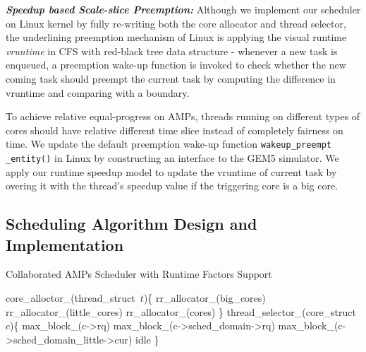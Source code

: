\documentclass[sigplan,review,anonymous]{acmart}\settopmatter{printfolios=true,printccs=false,printacmref=false}
\begin{document}
\textbf{\textit {Speedup based Scale-slice Preemption:}} Although we implement our scheduler on Linux kernel by fully re-writing both the core allocator and thread selector, the underlining preemption mechanism of Linux is applying the visual runtime {\it vruntime} in CFS with red-black tree data structure - whenever a new task is enqueued, a preemption wake-up function is invoked to check whether the new coming task should preempt the current task by computing the difference in vruntime and comparing with a boundary. 

To achieve relative equal-progress on AMPs, threads running on different types of cores should have relative different time slice instead of completely fairness on time. We update the default preemption wake-up function \texttt{wakeup\_preempt \_entity()} in Linux by constructing an interface to the GEM5 simulator. We apply our runtime speedup model to update the vruntime of current task by overing it with the thread's speedup value if the triggering core is a big core. 




\subsection{Scheduling Algorithm Design and Implementation}
\begin{algorithm}
\caption{Collaborated AMPs Scheduler with Runtime Factors Support}
\label{alg:1}
\begin{algorithmic}[1]
\STATE core\_alloctor\_(thread\_struct\ $t$)\{
\RETURN rr\_allocator\_(big\_cores)
\ENDIF
{}
\RETURN rr\_allocator\_(little\_cores)
\ENDIF
\RETURN rr\_allocator\_(cores)
\STATE \}
\STATE thread\_selector\_(core\_struct\ $c$)\{
\RETURN max\_block\_(c->rq)
\ENDIF
\RETURN max\_block\_(c->sched\_domain->rq)
\ENDIF
{}
\RETURN  max\_block\_(c->sched\_domain\_little->cur)
\ENDIF
\RETURN idle
\STATE \}
\end{algorithmic}
\end{algorithm}
\end{document}
